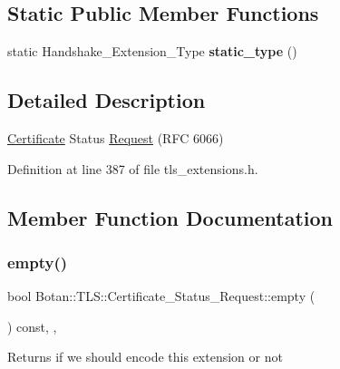 \subsection*{Static Public Member Functions}
\begin{DoxyCompactItemize}
\item 
\mbox{\label{class_botan_1_1_t_l_s_1_1_certificate___status___request_aff7acaffb93aad60769353dc6cec40fb}} 
static Handshake\+\_\+\+Extension\+\_\+\+Type {\bfseries static\+\_\+type} ()
\end{DoxyCompactItemize}


\subsection{Detailed Description}
\mbox{\hyperlink{class_botan_1_1_t_l_s_1_1_certificate}{Certificate}} Status \mbox{\hyperlink{struct_request}{Request}} (R\+FC 6066) 

Definition at line 387 of file tls\+\_\+extensions.\+h.



\subsection{Member Function Documentation}
\mbox{\label{class_botan_1_1_t_l_s_1_1_certificate___status___request_ae4224e1787859f27cbba86a038e1fc78}} 
\subsubsection{\texorpdfstring{empty()}{empty()}}
{\footnotesize\ttfamily bool Botan\+::\+T\+L\+S\+::\+Certificate\+\_\+\+Status\+\_\+\+Request\+::empty (\begin{DoxyParamCaption}{ }\end{DoxyParamCaption}) const\hspace{0.3cm}{\ttfamily [inline]}, {\ttfamily [override]}, {\ttfamily [virtual]}}

\begin{DoxyReturn}{Returns}
if we should encode this extension or not 
\end{DoxyReturn}


